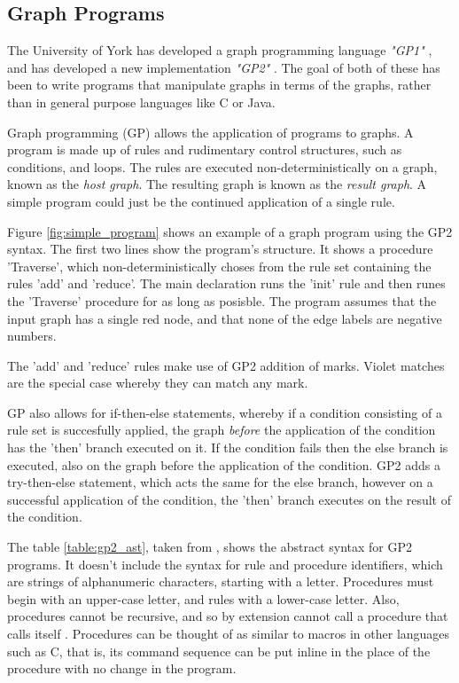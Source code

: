 \documentclass{UoYCSproject}
\begin{document}


\subsection{Graph Programs}
The University of York has developed a graph programming language \emph{"GP1"} \cite{gp1}, and has developed a new implementation \emph{"GP2"} \cite{gp2_design}. The goal of both of these has been to write programs that manipulate graphs in terms of the graphs, rather than in general purpose languages like C or Java. 

Graph programming (GP) allows the application of programs to graphs. A program is made up of rules and rudimentary control structures, such as conditions, and loops. The rules are executed non-deterministically on a graph, known as the \emph{host graph}. The resulting graph is known as the \emph{result graph}. A simple program could just be the continued application of a single rule. 

Figure \ref{fig:simple_program} shows an example of a graph program using the GP2 syntax. The first two lines show the program's structure. It shows a procedure 'Traverse', which non-deterministically choses from the rule set containing the rules 'add' and 'reduce'. The main declaration runs the 'init' rule and then runes the 'Traverse' procedure for as long as posisble. The program assumes that the input graph has a single red node, and that none of the edge labels are negative numbers.

The 'add' and 'reduce' rules make use of GP2 addition of marks. Violet matches are the special case whereby they can match any mark.

GP also allows for if-then-else statements, whereby if a condition consisting of a rule set is succesfully applied, the graph \emph{before} the application of the condition has the 'then' branch executed on it. If the condition fails then the else branch is executed, also on the graph before the application of the condition. GP2 adds a try-then-else statement, which acts the same for the else branch, however on a successful application of the condition, the 'then' branch executes on the result of the condition.

The table \ref{table:gp2_ast}, taken from \cite{chris_compiler}, shows the abstract syntax for GP2 programs. It doesn't include the syntax for rule and procedure identifiers, which are strings of alphanumeric characters, starting with a letter. Procedures must begin with an upper-case letter, and rules with a lower-case letter. Also, procedures cannot be recursive, and so by extension cannot call a procedure that calls itself \cite{chris_compiler}. Procedures can be thought of as similar to macros in other languages such as C, that is, its command sequence can be put inline in the place of the procedure with no change in the program.
\end{document}
